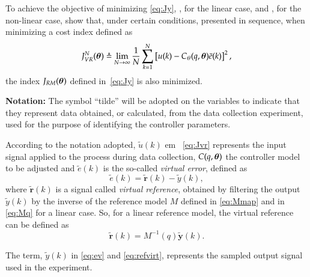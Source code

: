 To achieve the objective of minimizing \eqref{eq:Jy}, \cite{campi2002}, for the linear case, and \cite{campi2006}, for the non-linear case, show that, under certain conditions, presented in sequence, when minimizing a cost index defined as
\begin{equation}
 J_{VR}^N(\bm{\theta}) \triangleq \lim_{N \to \infty}  \frac{1}{N} \sum_{k=1}^N \left[u(k) - C_\theta(q,\bm{\theta})\bar{e}(k)\right]^2
   \label{eq:Jvr},
\end{equation}
the index $J_{RM}(\bm{\theta})$ defined in~\eqref{eq:Jy} is also minimized.

\textbf{Notation:} The symbol ``tilde'' will be adopted on the variables to indicate that they represent data obtained, or calculated, from the data collection experiment, used for the purpose of identifying the controller parameters.

According to the notation adopted, $\tilde{u}(k)$ em ~\eqref{eq:Jvr} represents the input signal applied to the process during data collection, $C (q,\bm{\theta})$ the controller model to be adjusted and $\tilde{e}(k)$ is the so-called \textit{virtual error}, defined as
\begin{equation}
   \tilde{e}(k) = \tilde{\bm{r}}(k) - \tilde{y}(k) 
   \label{eq:ev},
\end{equation}
where $\tilde{\bm{r}}(k)$ is a signal called \textit{virtual reference}, obtained by filtering the output $\tilde{y}(k)$ by the inverse of the reference model $M$ defined in  \eqref{eq:Mmap} and in \eqref{eq:Mq} for a linear case. So, for a linear reference model, the virtual reference can be defined as
\begin{equation}
   \tilde{\bm{r}}(k) = M^{-1}(q){\tilde{\bm{y}}}(k)
   \label{eq:refvirt}.
\end{equation}

The term, $\tilde{y}(k)$ in \eqref{eq:ev} and \eqref{eq:refvirt}, represents the sampled output signal used in the experiment.

